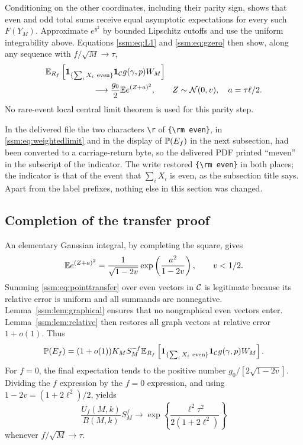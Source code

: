 Conditioning on the other coordinates, including their parity sign, shows that even and odd total sums receive equal asymptotic expectations for every such $F(Y_M)$. Approximate $e^{y^2}$ by bounded Lipschitz cutoffs and use the uniform integrability above. Equations \eqref{ssm:eq:L1} and \eqref{ssm:eq:gzero} then show, along any sequence with $f/\sqrt M\to\tau$,
\begin{equation}\label{ssm:eq:weightedlimit}
 \begin{split}
 &\E_{R_f}\left[\ind_{\{\sum_iX_i\ {\rm even}\}}\ind_{\cC}
 g(\gamma,p)W_M\right]\\
 &\hspace{20mm}\longrightarrow\frac{g_0}{2}\E e^{(Z+a)^2},
 \qquad Z\sim\Normal(0,v),\quad a=\tau\ell/2.
 \end{split}
\end{equation}
No rare-event local central limit theorem is used for this parity step.

\begin{writenote}
In the delivered file the two characters \verb|\r| of \verb|{\rm even}|, in
\eqref{ssm:eq:weightedlimit} and in the display of $\mathbb P(E_f)$ in the next
subsection, had been converted to a carriage-return byte, so the delivered
PDF printed ``meven'' in the subscript of the indicator. The write restored
\verb|{\rm even}| in both places; the indicator is that of the event that
$\sum_iX_i$ is even, as the subsection title says. Apart from the label
prefixes, nothing else in this section was changed.
\end{writenote}

\subsection{Completion of the transfer proof}
An elementary Gaussian integral, by completing the square, gives
\begin{equation}\label{ssm:eq:gaussianintegral}
 \mathbb E e^{(Z+a)^2}
 =\frac1{\sqrt{1-2v}}\exp\left(\frac{a^2}{1-2v}\right),\qquad v<1/2.
\end{equation}
Summing \eqref{ssm:eq:pointtransfer} over even vectors in $\mathcal C$ is legitimate because its relative error is uniform and all summands are nonnegative. Lemma~\ref{ssm:lem:graphical} ensures that no nongraphical even vectors enter. Lemma~\ref{ssm:lem:relative} then restores all graph vectors at relative error $1+o(1)$. Thus
\[
 \mathbb P(E_f)=(1+o(1))K_MS_M^{-f}
 \mathbb E_{R_f}\left[\mathbf1_{\{\sum_iX_i\ {\rm even}\}}\mathbf1_{\mathcal C}g(\gamma,p)W_M\right].
\]
For $f=0$, the final expectation tends to the positive number
$g_0/[2\sqrt{1-2v}]$. Dividing the $f$ expression by the $f=0$ expression, and using $1-2v=(1+2\ell^2)/2$, yields
\[
 \frac{U_f(M,k)}{B(M,k)}S_M^f
 \longrightarrow\exp\left\{\frac{\ell^2\tau^2}{2(1+2\ell^2)}\right\}
\]
whenever $f/\sqrt M\to\tau$.

